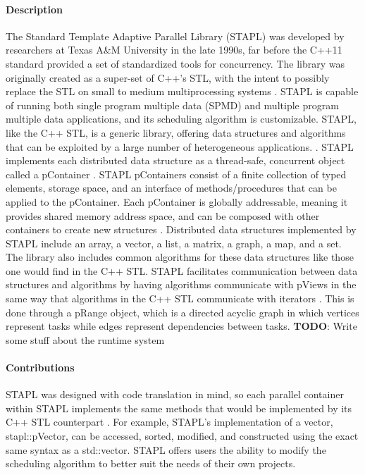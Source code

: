 \paragraph{Description} 
The Standard Template Adaptive Parallel Library (STAPL) was developed by researchers at Texas A\&M University in the late 1990s, far before the C++11 standard provided a set of standardized tools for concurrency. The library was originally created as a super-set of C++'s STL, with the intent to possibly replace the STL on small to medium multiprocessing systems \cite{STAPL}. STAPL is capable of running both single program multiple data (SPMD) and multiple program multiple data applications, and its scheduling algorithm is customizable. STAPL, like the C++ STL, is a generic library, offering data structures and algorithms that can be exploited by a large number of heterogeneous applications. \cite{STAPL}. STAPL implements each distributed data structure as a thread-safe, concurrent object called a pContainer \cite{stapl_parallel_container}. STAPL pContainers consist of a finite collection of typed elements, storage space, and an interface of methods/procedures that can be applied to the pContainer. \cite{stapl_parallel_container} Each pContainer is globally addressable, meaning it provides shared memory address space, and can be composed with other containers to create new structures \cite{stapl_parallel_container}. Distributed data structures implemented by STAPL include an array, a vector, a list, a matrix, a graph, a map, and a set. The library also includes common algorithms for these data structures like those one would find in the C++ STL. STAPL facilitates communication between data structures and algorithms by having algorithms communicate with pViews in the same way that algorithms in the C++ STL communicate with iterators \cite{stapl_parallel_container}. This is done through a pRange object, which is a directed acyclic graph in which vertices represent tasks while edges represent dependencies between tasks.
\textbf{TODO}:  Write some stuff about the runtime system
\cite{stapl_rts}


\paragraph{Contributions} 

STAPL was designed with code translation in mind, so each parallel container within STAPL implements the same methods that would be implemented by its C++ STL counterpart \cite{stapl_parallel_container}. For example, STAPL's implementation of a vector, stapl::pVector, can be accessed, sorted, modified, and constructed using the exact same syntax as a std::vector. STAPL offers users the ability to modify the scheduling algorithm to better suit the needs of their own projects.


